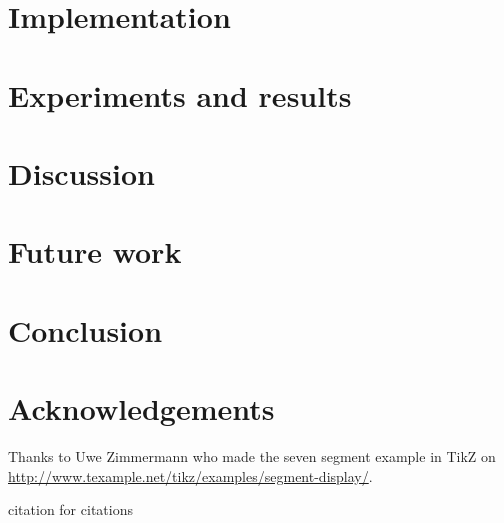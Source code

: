 \documentclass[a4paper]{report}
\begin{document}
\chapter{Implementation}


\chapter{Experiments and results}
\label{chap:exp}


\chapter{Discussion}


\chapter{Future work}


\chapter{Conclusion}


\chapter*{Acknowledgements}
Thanks to Uwe Zimmermann who made the seven segment example in TikZ on \url{http://www.texample.net/tikz/examples/segment-display/}.


\newpage
citation for citations\cite{Bengtsson1995}




\newpage



\appendix

\end{document}
